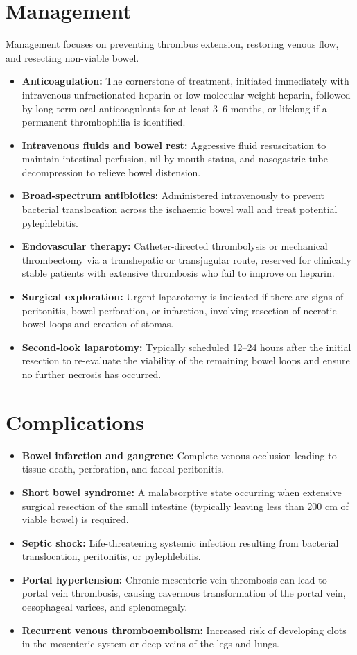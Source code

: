 \section*{Management}
Management focuses on preventing thrombus extension, restoring venous flow, and resecting non-viable bowel.
\begin{itemize}
    \item \textbf{Anticoagulation:} The cornerstone of treatment, initiated immediately with intravenous unfractionated heparin or low-molecular-weight heparin, followed by long-term oral anticoagulants for at least 3--6 months, or lifelong if a permanent thrombophilia is identified.
    \item \textbf{Intravenous fluids and bowel rest:} Aggressive fluid resuscitation to maintain intestinal perfusion, nil-by-mouth status, and nasogastric tube decompression to relieve bowel distension.
    \item \textbf{Broad-spectrum antibiotics:} Administered intravenously to prevent bacterial translocation across the ischaemic bowel wall and treat potential pylephlebitis.
    \item \textbf{Endovascular therapy:} Catheter-directed thrombolysis or mechanical thrombectomy via a transhepatic or transjugular route, reserved for clinically stable patients with extensive thrombosis who fail to improve on heparin.
    \item \textbf{Surgical exploration:} Urgent laparotomy is indicated if there are signs of peritonitis, bowel perforation, or infarction, involving resection of necrotic bowel loops and creation of stomas.
    \item \textbf{Second-look laparotomy:} Typically scheduled 12--24 hours after the initial resection to re-evaluate the viability of the remaining bowel loops and ensure no further necrosis has occurred.
\end{itemize}

\section*{Complications}
\begin{itemize}
    \item \textbf{Bowel infarction and gangrene:} Complete venous occlusion leading to tissue death, perforation, and faecal peritonitis.
    \item \textbf{Short bowel syndrome:} A malabsorptive state occurring when extensive surgical resection of the small intestine (typically leaving less than 200 cm of viable bowel) is required.
    \item \textbf{Septic shock:} Life-threatening systemic infection resulting from bacterial translocation, peritonitis, or pylephlebitis.
    \item \textbf{Portal hypertension:} Chronic mesenteric vein thrombosis can lead to portal vein thrombosis, causing cavernous transformation of the portal vein, oesophageal varices, and splenomegaly.
    \item \textbf{Recurrent venous thromboembolism:} Increased risk of developing clots in the mesenteric system or deep veins of the legs and lungs.
\end{itemize}

